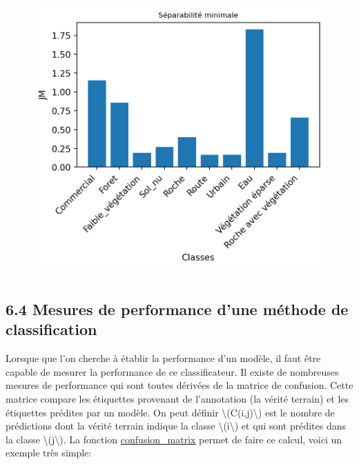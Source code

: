 \documentclass[
]{article}
\begin{document}
\label{f8b38b5a}
\begin{figure}
\centering
\includegraphics[width=4.67708in,height=4.19792in]{05-ClassificationsSupervisees_files/figure-html/cell-17-output-1.png}
\caption{}
\end{figure}

\subsection{\texorpdfstring{{6.4} Mesures de performance d'une méthode
de
classification}{6.4 Mesures de performance d'une méthode de classification}}\label{mesures-de-performance-dune-muxe9thode-de-classification}

Lorsque que l'on cherche à établir la performance d'un modèle, il faut
être capable de mesurer la performance de ce classificateur. Il existe
de nombreuses mesures de performance qui sont toutes dérivées de la
matrice de confusion. Cette matrice compare les étiquettes provenant de
l'annotation (la vérité terrain) et les étiquettes prédites par un
modèle. On peut définir {\textbackslash(C(i,j)\textbackslash)} est le
nombre de prédictions dont la vérité terrain indique la classe
{\textbackslash(i\textbackslash)} et qui sont prédites dans la classe
{\textbackslash(j\textbackslash)}. La fonction
\href{https://scikit-learn.org/stable/modules/generated/sklearn.metrics.confusion_matrix.html}{confusion\_matrix}
permet de faire ce calcul, voici un exemple très simple:
\end{document}
